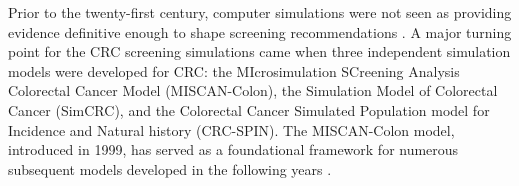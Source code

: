 Prior to the twenty-first century, computer simulations were not seen as providing evidence definitive enough to shape screening recommendations \cite{phillips_screening_2020}. A major turning point for the CRC screening simulations came when three independent simulation models were developed for CRC: the MIcrosimulation SCreening Analysis Colorectal Cancer Model (MISCAN-Colon)\cite{loeve_miscan-colon_1999}, the Simulation Model of Colorectal Cancer (SimCRC)\cite{knudsen_rescreening_2012}, and the Colorectal Cancer Simulated Population model for Incidence and Natural history (CRC-SPIN)\cite{rutter_bayesian_2009}. The MISCAN-Colon model, introduced in 1999, has served as a foundational framework for numerous subsequent models developed in the following years \cite{smith_simulation_2020}.